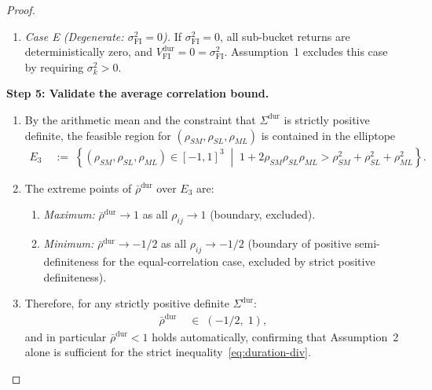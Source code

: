 \documentclass[12pt,openany]{book}
\numberwithin{equation}{chapter}
\theoremstyle{plain}
\theoremstyle{definition}
\theoremstyle{remark}
\def\mathcal#1{#1}%
\begin{document}
\begin{proof}
\begin{enumerate}
\begin{align}
            \frac{\sigma_{\mathrm{FI}}^2}{3},\;
            \frac{\sigma_{\mathrm{FI}}^2}{3}
            + \frac{2\,\sigma_{\mathrm{FI}}^2}{3}(0.9)
          \right]
          \nonumber\\
          &\;=\;
          \left[
            \frac{\sigma_{\mathrm{FI}}^2}{3},\;
            0.933\,\sigma_{\mathrm{FI}}^2
          \right],
        \end{align}
        both endpoints strictly below $\sigma_{\mathrm{FI}}^2$,
        confirming diversification benefit across the entire
        empirically observed range.
  \item \textit{Case E (Degenerate: $\sigma_{\mathrm{FI}}^2 = 0$).}
        If $\sigma_{\mathrm{FI}}^2 = 0$, all sub-bucket returns
        are deterministically zero, and
        $V_{\mathrm{FI}}^{\mathrm{dur}} = 0 = \sigma_{\mathrm{FI}}^2$.
        Assumption~1 excludes this case by requiring
        $\sigma_k^2 > 0$.
\end{enumerate}

\medskip
\noindent\textbf{Step 5: Validate the average correlation bound.}

\begin{enumerate}
  \item By the arithmetic mean and the constraint that
        $\Sigma^{\mathrm{dur}}$ is strictly positive definite,
        the feasible region for
        $(\rho_{SM}, \rho_{SL}, \rho_{ML})$
        is contained in the elliptope
        \begin{align}
          \mathcal{E}_3
          &\;:=\;
          \left\{
            (\rho_{SM}, \rho_{SL}, \rho_{ML}) \in [-1,1]^3
            \;\middle|\;
            1 + 2\rho_{SM}\rho_{SL}\rho_{ML}
            > \rho_{SM}^2 + \rho_{SL}^2 + \rho_{ML}^2
          \right\}.
        \end{align}
  \item The extreme points of $\bar{\rho}^{\mathrm{dur}}$ over
        $\mathcal{E}_3$ are:
        \begin{enumerate}
          \item \textit{Maximum:}
                $\bar{\rho}^{\mathrm{dur}} \to 1$ as all
                $\rho_{ij} \to 1$ (boundary, excluded).
          \item \textit{Minimum:}
                $\bar{\rho}^{\mathrm{dur}} \to -1/2$ as all
                $\rho_{ij} \to -1/2$ (boundary of
                positive semi-definiteness for the equal-correlation
                case, excluded by strict positive definiteness).
        \end{enumerate}
  \item Therefore, for any strictly positive definite
        $\Sigma^{\mathrm{dur}}$:
        \begin{align}
          \bar{\rho}^{\mathrm{dur}} &\;\in\; (-1/2,\; 1),
        \end{align}
        and in particular $\bar{\rho}^{\mathrm{dur}} < 1$ holds
        automatically, confirming that
        Assumption~2 alone is sufficient for the strict
        inequality~\eqref{eq:duration-div}.
\end{enumerate}


\end{proof}
\end{document}
